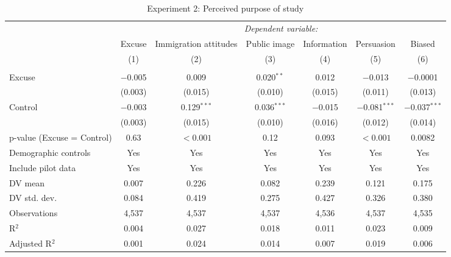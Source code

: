 
\begin{table}[!htbp] \centering 
  \caption{Experiment 2: Perceived purpose of study} 
  \label{t:2-purpose} 
\begin{threeparttable}
\begin{tabular}{@{\hspace{5pt}}l@{\hspace{5pt}}cccccc} 
\toprule 
 & \multicolumn{6}{c}{\textit{Dependent variable:}} \\ 
\cmidrule(rr){2-7} 
 & Excuse & Immigration attitudes & Public image & Information & Persuasion & Biased \\ 
 & (1) & (2) & (3) & (4) & (5) & (6)\\ 
\midrule  
\\[-2.1ex] Excuse & $-$0.005 & 0.009 & 0.020$^{**}$ & 0.012 & $-$0.013 & $-$0.0001 \\ 
  & (0.003) & (0.015) & (0.010) & (0.015) & (0.011) & (0.013) \\ 
 \addlinespace 
 Control & $-$0.003 & 0.129$^{***}$ & 0.036$^{***}$ & $-$0.015 & $-$0.081$^{***}$ & $-$0.037$^{***}$ \\ 
  & (0.003) & (0.015) & (0.010) & (0.016) & (0.012) & (0.014) \\ 
 \addlinespace 
p-value (Excuse = Control) & 0.63 & $<0.001$ & 0.12 & 0.093 & $<0.001$ & 0.0082 \\ 
\midrule  
Demographic controls & Yes & Yes & Yes & Yes & Yes & Yes \\ 
\midrule
Include pilot data & Yes & Yes & Yes & Yes & Yes & Yes \\
\addlinespace
DV mean & 0.007 & 0.226 & 0.082 & 0.239 & 0.121 & 0.175 \\
DV std. dev. & 0.084 & 0.419 & 0.275 & 0.427 & 0.326 & 0.380 \\
Observations & 4,537 & 4,537 & 4,537 & 4,536 & 4,537 & 4,535 \\ 
R$^{2}$ & 0.004 & 0.027 & 0.018 & 0.011 & 0.023 & 0.009 \\ 
Adjusted R$^{2}$ & 0.001 & 0.024 & 0.014 & 0.007 & 0.019 & 0.006 \\ 
\bottomrule 
\end{tabular} 
\begin{tablenotes}
\footnotesize

\end{tablenotes}
\end{threeparttable}
\end{table}
